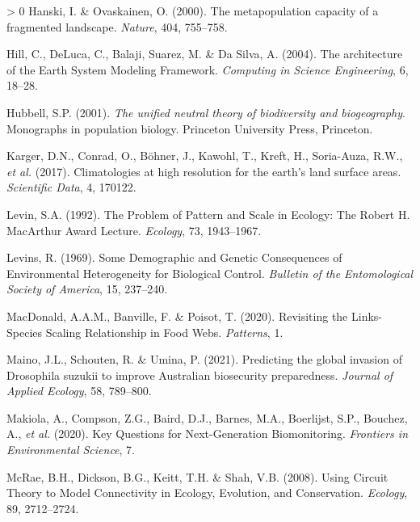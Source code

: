 \documentclass[11pt]{article}
\newlength{\cslhangindent}
\newenvironment{CSLReferences}[3] %
 {%
  \setlength{\parindent}{0pt}
  \ifodd #1 \everypar{\setlength{\hangindent}{\cslhangindent}}\ignorespaces\fi
  \ifnum #2 > 0
  \setlength{\parskip}{#2\baselineskip}
  \fi
 }%
 {}
\begin{document}
\begin{CSLReferences}{1}{0}
\leavevmode\hypertarget{ref-Hanski2000MetCap}{}%
Hanski, I. \& Ovaskainen, O. (2000). The metapopulation capacity of a
fragmented landscape. \emph{Nature}, 404, 755--758.

\leavevmode\hypertarget{ref-Hill2004ArcEar}{}%
Hill, C., DeLuca, C., Balaji, Suarez, M. \& Da Silva, A. (2004). The
architecture of the Earth System Modeling Framework. \emph{Computing in
Science Engineering}, 6, 18--28.

\leavevmode\hypertarget{ref-Hubbell2001UniNeu}{}%
Hubbell, S.P. (2001). \emph{The unified neutral theory of biodiversity
and biogeography}. Monographs in population biology. Princeton
University Press, Princeton.

\leavevmode\hypertarget{ref-Karger2017CliHig}{}%
Karger, D.N., Conrad, O., Böhner, J., Kawohl, T., Kreft, H., Soria-Auza,
R.W., \emph{et al.} (2017). Climatologies at high resolution for the
earth's land surface areas. \emph{Scientific Data}, 4, 170122.

\leavevmode\hypertarget{ref-Levin1992ProPat}{}%
Levin, S.A. (1992). The Problem of Pattern and Scale in Ecology: The
Robert H. MacArthur Award Lecture. \emph{Ecology}, 73, 1943--1967.

\leavevmode\hypertarget{ref-Levins1969DemGen}{}%
Levins, R. (1969). Some Demographic and Genetic Consequences of
Environmental Heterogeneity for Biological Control. \emph{Bulletin of
the Entomological Society of America}, 15, 237--240.

\leavevmode\hypertarget{ref-MacDonald2020RevLin}{}%
MacDonald, A.A.M., Banville, F. \& Poisot, T. (2020). Revisiting the
Links-Species Scaling Relationship in Food Webs. \emph{Patterns}, 1.

\leavevmode\hypertarget{ref-Maino2021PreGlo}{}%
Maino, J.L., Schouten, R. \& Umina, P. (2021). Predicting the global
invasion of Drosophila suzukii to improve Australian biosecurity
preparedness. \emph{Journal of Applied Ecology}, 58, 789--800.

\leavevmode\hypertarget{ref-Makiola2020KeyQue}{}%
Makiola, A., Compson, Z.G., Baird, D.J., Barnes, M.A., Boerlijst, S.P.,
Bouchez, A., \emph{et al.} (2020). Key Questions for Next-Generation
Biomonitoring. \emph{Frontiers in Environmental Science}, 7.

\leavevmode\hypertarget{ref-McRae2008UsiCir}{}%
McRae, B.H., Dickson, B.G., Keitt, T.H. \& Shah, V.B. (2008). Using
Circuit Theory to Model Connectivity in Ecology, Evolution, and
Conservation. \emph{Ecology}, 89, 2712--2724.


\end{CSLReferences}
\end{document}
